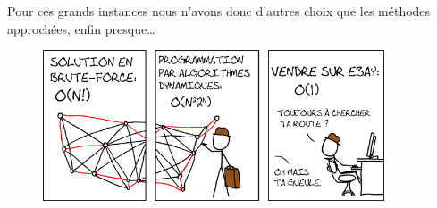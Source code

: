 Pour ces grands instances nous n'avons donc d'autres choix que les
méthodes approchées, enfin presque\dots

\begin{figure}[h!]
\centering
\includegraphics[width=0.9\textwidth]{../images/salesman1.png}
\end{figure}
